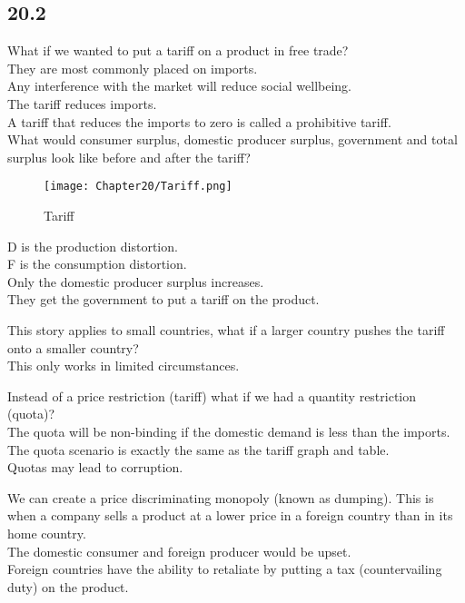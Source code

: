 \subsection*{20.2}
What if we wanted to put a tariff on a product in free trade?\\
They are most commonly placed on imports.\\
Any interference with the market will reduce social wellbeing.\\
The tariff reduces imports.\\
A tariff that reduces the imports to zero is called a prohibitive tariff.\\
What would consumer surplus, domestic producer surplus, government and total surplus look like before and after the tariff?
\begin{figure}[H]
    \centering
    \texttt{[image: Chapter20/Tariff.png]}
    \caption{Tariff}
    \label{fig:tariff}
\end{figure}
D is the production distortion.\\
F is the consumption distortion.\\
Only the domestic producer surplus increases.\\
They get the government to put a tariff on the product.
\par
This story applies to small countries, what if a larger country pushes the tariff onto a smaller country?\\
This only works in limited circumstances.
\par
Instead of a price restriction (tariff) what if we had a quantity restriction (quota)?\\
The quota will be non-binding if the domestic demand is less than the imports.\\
The quota scenario is exactly the same as the tariff graph and table.\\
Quotas may lead to corruption.
\par
We can create a price discriminating monopoly (known as dumping). This is when a company sells a product at a lower price in a foreign country than in its home country.\\
The domestic consumer and foreign producer would be upset.\\
Foreign countries have the ability to retaliate by putting a tax (countervailing duty) on the product.